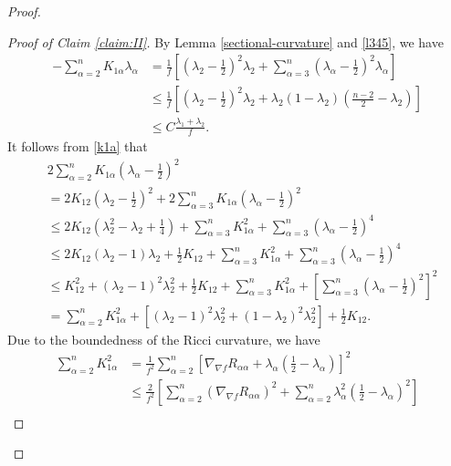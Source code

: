 \documentclass[a4, 12pt]{amsart}
\theoremstyle{plain}
\begin{document}
\begin{proof}
\begin{proof}[Proof of Claim \ref{claim:II}]
		By Lemma \ref{sectional-curvature} and \eqref{l345}, we have
		\begin{align*}
			-\sum_{\alpha=2}^n K_{1\alpha}\lambda_\alpha &= \frac{1}{f}\left[\left(\lambda_2 - \frac{1}{2}\right)^2\lambda_2 + \sum_{\alpha=3}^n\left(\lambda_\alpha - \frac{1}{2}\right)^2\lambda_\alpha\right] \\
			&\leq \frac{1}{f}\left[\left(\lambda_2 - \frac{1}{2}\right)^2\lambda_2 + \lambda_2(1-\lambda_2)\left(\frac{n-2}{2} - \lambda_2\right)\right] \\
			&\leq C\frac{\lambda_1+\lambda_2}{f}.
		\end{align*}
		It follows from \eqref{k1a} that
		\begin{align*}
			&2\sum_{\alpha=2}^n K_{1\alpha}\left(\lambda_\alpha - \frac{1}{2}\right)^2 \\
			&= 2K_{12}\left(\lambda_2 - \frac{1}{2}\right)^2 + 2\sum_{\alpha=3}^n K_{1\alpha}\left(\lambda_\alpha - \frac{1}{2}\right)^2 \\
			&\leq 2K_{12}\left(\lambda_2^2 - \lambda_2 + \frac{1}{4}\right) + \sum_{\alpha=3}^n K_{1\alpha}^2 + \sum_{\alpha=3}^n \left(\lambda_\alpha - \frac{1}{2}\right)^4 \\
			&\leq 2K_{12}(\lambda_2-1)\lambda_2 + \frac{1}{2}K_{12} + \sum_{\alpha=3}^n K_{1\alpha}^2 + \sum_{\alpha=3}^n \left(\lambda_\alpha - \frac{1}{2}\right)^4 \\
			&\leq K_{12}^2 + (\lambda_2-1)^2\lambda_{2}^2 + \frac{1}{2}K_{12} + \sum_{\alpha=3}^n K_{1\alpha}^2 + \left[\sum_{\alpha=3}^n\left(\lambda_\alpha - \frac{1}{2}\right)^2\right]^2 \\
			&= \sum_{\alpha=2}^n K_{1\alpha}^2 + \left[(\lambda_2-1)^2\lambda_{2}^2 + (1-\lambda_2)^2\lambda_{2}^2\right] + \frac{1}{2}K_{12}.%
		\end{align*}
		Due to the boundedness of the Ricci curvature, we have
		\begin{equation}\label{eq:K1a-square}
		\begin{aligned}
			\sum_{\alpha=2}^n K_{1\alpha}^2 &= \frac{1}{f^2}\sum_{\alpha=2}^n\left[\nabla_{\nabla f}R_{\alpha\alpha} + \lambda_\alpha\left(\frac{1}{2} - \lambda_\alpha\right)\right]^2 \\
			&\leq \frac{2}{f^2}\left[\sum_{\alpha=2}^n\left(\nabla_{\nabla f}R_{\alpha\alpha}\right)^2 + \sum_{\alpha=2}^n\lambda_\alpha^2\left(\frac{1}{2} - \lambda_\alpha\right)^2\right] \\

\end{aligned}
\end{equation}
\end{proof}
\end{proof}
\end{document}
